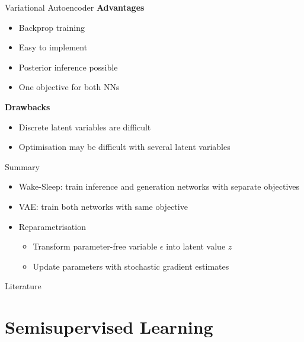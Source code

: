 \documentclass[14pt, aspectratio=169]{beamer}
\begin{document}
\begin{frame}{Variational Autoencoder}
\textbf{Advantages}
\begin{itemize}
\item Backprop training
\item Easy to implement
\item Posterior inference possible
\item One objective for both NNs
\end{itemize}
\pause
\textbf{Drawbacks}
\begin{itemize}
\item Discrete latent variables are difficult
\item Optimisation may be difficult with several latent variables
\end{itemize}
\end{frame}

\begin{frame}{Summary}
\begin{itemize}
\item Wake-Sleep: train inference and generation networks with separate objectives
\item VAE: train both networks with same objective
\item Reparametrisation
\begin{itemize}
\item  Transform parameter-free variable $ \epsilon $ into latent value $ z $
\item Update parameters with stochastic gradient estimates
\end{itemize}
\end{itemize}
\end{frame}

\begin{frame}[allowframebreaks]{Literature}
\nocite{KingmaWelling:2013}
\nocite{HintonEtAl:1995}
\nocite{RezendeEtAl:2014}
\nocite{TitsiasLazarogredilla:2014}
\nocite{KucukelbirEtAl:2017}



\end{frame}

\section{Semisupervised Learning}
\end{document}
